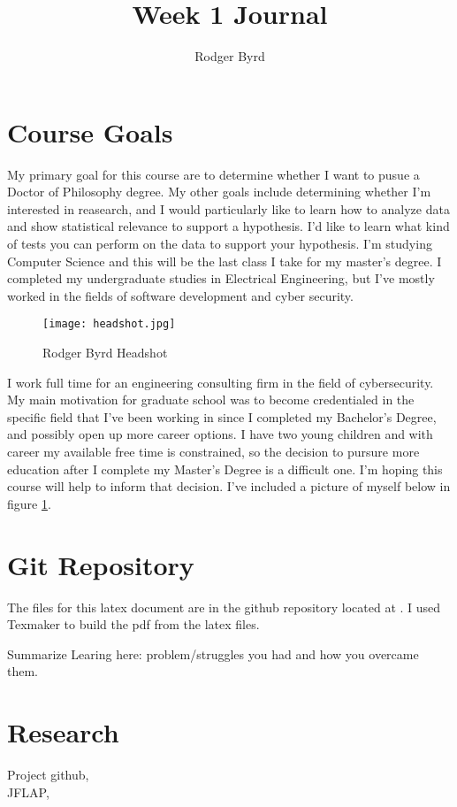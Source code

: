 \documentclass{article}
\begin{document}
\doublespacing

\title{Week 1 Journal}
\author{Rodger Byrd}
\maketitle


\section{Course Goals}
My primary goal for this course are to determine whether I want to pusue a Doctor of Philosophy degree. My other goals include determining whether I'm interested in reasearch, and I would particularly like to learn how to analyze data and show statistical relevance to support a hypothesis. I'd like to learn what kind of tests you can perform on the data to support your hypothesis. I'm studying Computer Science and this will be the last class I take for my master's degree. I completed my undergraduate studies in Electrical Engineering, but I've mostly worked in the fields of software development and cyber security.
\begin{figure}[H]
  \centerline{\texttt{[image: headshot.jpg]}}
  \caption{Rodger Byrd Headshot}
  \label{fig:HS}
\end{figure} 
I work full time for an engineering consulting firm in the field of cybersecurity. My main motivation for graduate school was to become credentialed in the specific field that I've been working in since I completed my Bachelor's Degree, and possibly open up more career options. I have two young children and with career my available free time is constrained, so the decision to pursure more education after I complete my Master's Degree is a difficult one. I'm hoping this course will help to inform that decision. I've included a picture of myself below in figure \ref{fig:HS}.

\section{Git Repository}
The files for this latex document are in the github repository located at . I used Texmaker to build the pdf from the latex files.

Summarize Learing here: problem/struggles you had and how you overcame them.

\section{Research}


\begin{thebibliography}{9}
Project github, \\
JFLAP, \\
\end{thebibliography}
\end{document}
